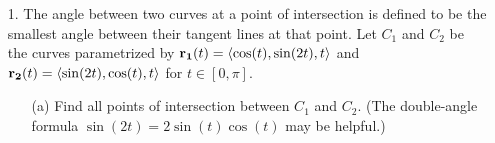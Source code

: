 \documentclass[reqno, 12pt]{amsart}
\begin{document}
\newpage
\begin{itemize}
  \item[1.] The angle between two curves at a point of intersection is defined to be the smallest angle between their tangent lines at that point. Let $C_1$ and $C_2$ be the curves parametrized by ${\bf r_1}(t) = \langle \cos(t),\sin(2t),t\rangle$ and ${\bf r_2}(t) = \langle \sin(2t), \cos(t), t\rangle$ for $t \in [0,\pi]$.
    \newline

    \begin{itemize}
      \item[(a)] Find all points of intersection between $C_1$ and $C_2$. (The double-angle formula $\sin(2t) = 2\sin(t)\cos(t)$ may be helpful.)
        \newline


\end{itemize}
\end{itemize}
\end{document}
